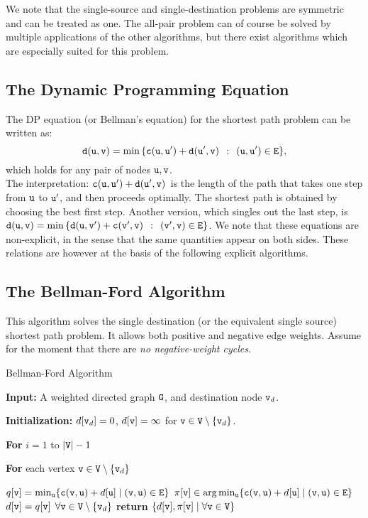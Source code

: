 We note that the single-source and single-destination problems are symmetric and can be treated as one.  The all-pair problem can of course be solved by multiple applications of the other algorithms, but there exist algorithms which are especially suited for this problem.

\subsection{The Dynamic Programming Equation}
The DP equation (or Bellman's equation) for the shortest path problem can be written as:
\[{\tt d}({\tt u},{\tt v}) = \min \,\{ {\tt c}({\tt u},{\tt u}') + {\tt d}({\tt u}',{\tt v})\,\;:\,\;({\tt u},{\tt u}') \in {\tt E}\}, \]
which holds for any pair of nodes ${\tt u},{\tt v}$.
\\
The interpretation: ${\tt c}({\tt u},{\tt u}') + {\tt d}({\tt u}',{\tt v})\,\;$is the length of the path that takes one step from ${\tt u}$ to ${\tt u}'$, and then proceeds optimally. The shortest path is obtained by choosing the best first step.
Another version, which singles out the last step, is
${\tt d}({\tt u},{\tt v}) = \min \,\{ {\tt d}({\tt u},{\tt v}') + {\tt c}({\tt v}',{\tt v})\,\;:\,\;({\tt v}',{\tt v}) \in {\tt E}\} $.
We note that these equations are non-explicit, in the sense that the same quantities appear on both sides.  These relations are however at the basis of the following explicit algorithms.

\subsection{The Bellman-Ford Algorithm}
This algorithm solves the single destination (or the equivalent single source) shortest path problem. It allows both positive and negative edge weights. Assume for the moment that there are \emph{no negative-weight cycles}.

\begin{algorithm}
\caption{Bellman-Ford Algorithm}
\label{Alg:BellmanFord}
\begin{algorithmic}[1]
\State \textbf{Input:} A weighted directed graph ${\tt G}$, and destination node ${\tt v}_d$.

\State \textbf{Initialization:} 
\State \quad $d[{\tt v}_d] = 0$,  
\State \quad $d[{\tt v}] = \infty$ for ${\tt v} \in {\tt V} \setminus \{ {\tt v}_d\}$.
\State \quad {}

\State \textbf{For} $i = 1$ to $|{\tt V}| - 1$

\State \quad \textbf{For} {each vertex ${\tt v} \in {\tt V} \setminus \{ {\tt v}_d\}$}

\State \qquad $q[{\tt v}] = \min_{{\tt u}}\{{\tt c}({\tt v},{\tt u}) + d[{\tt u}] \mid ({\tt v},{\tt u}) \in {\tt E}\}$
\State \qquad $\pi[{\tt v}] \in \arg\min_{{\tt u}}\{{\tt c}({\tt v},{\tt u}) + d[{\tt u}] \mid ({\tt v},{\tt u}) \in {\tt E}\}$
\State \quad $d[{\tt v}] = q[{\tt v}]$ \quad $\forall {\tt v} \in {\tt V} \setminus \{ {\tt v}_d\}$
\State \textbf{return} $\{d[{\tt v}], \pi[{\tt v}] \mid \forall {\tt v} \in {\tt V}\}$
\end{algorithmic}
\end{algorithm}

